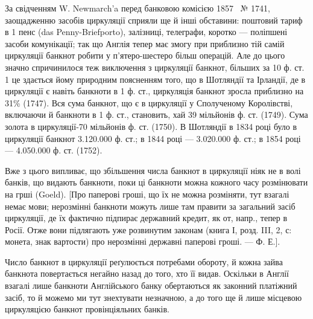 За свідченням W. Newmarch’a перед банковою комісією 1857~ № 1741,
заощадженню засобів циркуляції сприяли ще й інші обставини: поштовий тариф
в 1 пенс (das Penny-Briefporto), залізниці, телеграфи, коротко — поліпшені засоби
комунікації; так що Англія тепер має змогу при приблизно тій самій циркуляції
банкнот робити у п’ятеро-шестеро більш операцій. Але до цього значно
спричинилося теж виключення з циркуляції банкнот, більших за 10 ф. ст. 1 це
здається йому природним поясненням того, що в Шотляндії та Ірландії, де в
циркуляції є навіть банкноти в 1 ф. ст., циркуляція банкнот зросла приблизно
на 31\% (1747). Вся сума банкнот, що є в циркуляції у Сполученому Королівстві,
включаючи й банкноти в 1 ф. ст., становить, хай 39 мільйонів ф. ст.
(1749). Сума золота в циркуляції-70 мільйонів ф. ст. (1750). В Шотляндії
в 1834 році було в циркуляції банкнот 3.120.000 ф. ст.; в 1844 році —
3.020.000 ф. ст.; в 1854 році — 4.050.000 ф. ст. (1752).

Вже з цього випливає, що збільшення числа банкнот в циркуляції ніяк
не в волі банків, що видають банкноти, поки ці банкноти можна кожного часу
розмінювати на грші (Goeld). [Про паперові гроші, що їх не можна розміняти,
тут взагалі немає мови; нерозмінні банкноти можуть лише там правити за загальний
засіб циркуляції, де їх фактично підпирає державний кредит, як от, напр., тепер
в Росії. Отже вони підлягають уже розвинутим законам (книга І, розд. III, 2, с:
монета, знак вартости) про нерозмінні державні паперові гроші. — Ф. Е.].

Число банкнот в циркуляції реґулюється потребами обороту, й кожна
зайва банкнота повертається негайно назад до того, хто її видав. Оскільки в
Англії взагалі лише банкноти Англійського банку обертаються як законний
платіжний засіб, то й можемо ми тут знехтувати незначною, а до того ще й лише
місцевою циркуляцією банкнот провінціяльних банків.

